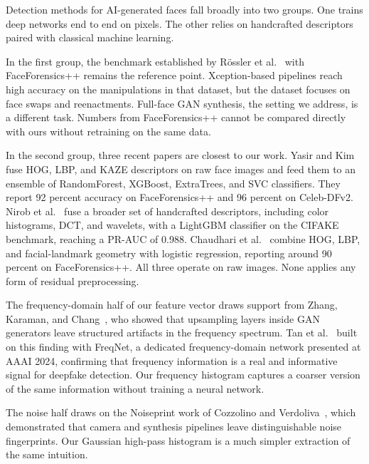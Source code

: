 \documentclass[runningheads]{llncs}
\begin{document}
Detection methods for AI-generated faces fall broadly into two groups. One trains deep networks end to end on pixels. The other relies on handcrafted descriptors paired with classical machine learning.

In the first group, the benchmark established by R\"{o}ssler et al.~\cite{rossler2019} with FaceForensics++ remains the reference point. Xception-based pipelines reach high accuracy on the manipulations in that dataset, but the dataset focuses on face swaps and reenactments. Full-face GAN synthesis, the setting we address, is a different task. Numbers from FaceForensics++ cannot be compared directly with ours without retraining on the same data.

In the second group, three recent papers are closest to our work. Yasir and Kim~\cite{yasir2025} fuse HOG, LBP, and KAZE descriptors on raw face images and feed them to an ensemble of RandomForest, XGBoost, ExtraTrees, and SVC classifiers. They report 92 percent accuracy on FaceForensics++ and 96 percent on Celeb-DFv2. Nirob et al.~\cite{nirob2026} fuse a broader set of handcrafted descriptors, including color histograms, DCT, and wavelets, with a LightGBM classifier on the CIFAKE benchmark, reaching a PR-AUC of 0.988. Chaudhari et al.~\cite{chaudhari2026} combine HOG, LBP, and facial-landmark geometry with logistic regression, reporting around 90 percent on FaceForensics++. All three operate on raw images. None applies any form of residual preprocessing.

The frequency-domain half of our feature vector draws support from Zhang, Karaman, and Chang~\cite{zhang2019}, who showed that upsampling layers inside GAN generators leave structured artifacts in the frequency spectrum. Tan et al.~\cite{tan2024} built on this finding with FreqNet, a dedicated frequency-domain network presented at AAAI 2024, confirming that frequency information is a real and informative signal for deepfake detection. Our frequency histogram captures a coarser version of the same information without training a neural network.

The noise half draws on the Noiseprint work of Cozzolino and Verdoliva~\cite{cozzolino2018}, which demonstrated that camera and synthesis pipelines leave distinguishable noise fingerprints. Our Gaussian high-pass histogram is a much simpler extraction of the same intuition.
\end{document}
